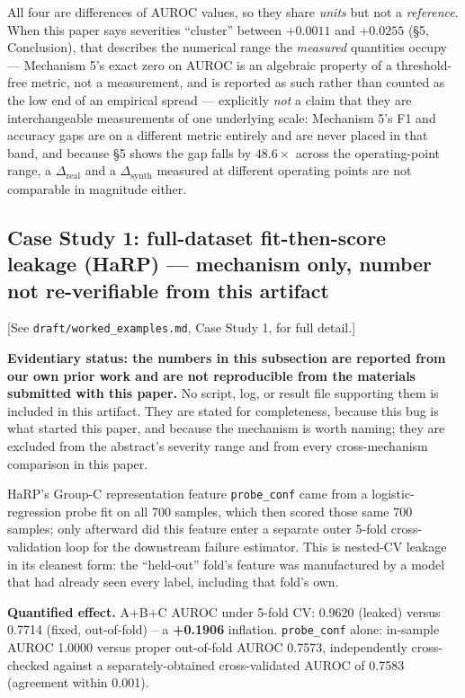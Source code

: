 \documentclass[10pt]{article} %
\begin{document}
All four are differences of AUROC values, so they share \emph{units} but not a
\emph{reference}. When this paper says severities ``cluster'' between
$+0.0011$ and $+0.0255$ (§5, Conclusion), that describes the numerical range
the \emph{measured} quantities occupy --- Mechanism 5's exact zero on AUROC is
an algebraic property of a threshold-free metric, not a measurement, and is
reported as such rather than counted as the low end of an empirical spread --- explicitly \emph{not} a claim that they are
interchangeable measurements of one underlying scale: Mechanism 5's F1 and
accuracy gaps are on a different metric entirely and are never placed in that
band, and because §5 shows the gap falls by $48.6\times$ across the
operating-point range, a $\Delta_{\text{real}}$ and a $\Delta_{\text{synth}}$
measured at different operating points are not comparable in magnitude either.

\subsection{Case Study 1: full-dataset fit-then-score leakage (HaRP) --- mechanism only, number not re-verifiable from this artifact}

[See \texttt{draft/worked\_examples.md}, Case Study 1, for full detail.]

\textbf{Evidentiary status: the numbers in this subsection are reported
from our own prior work and are not reproducible from the materials
submitted with this paper.} No script, log, or result file supporting
them is included in this artifact. They are stated for completeness,
because this bug is what started this paper, and because the mechanism is
worth naming; they are excluded from the abstract's severity range and
from every cross-mechanism comparison in this paper.

HaRP's Group-C representation feature \texttt{probe\_conf} came from a
logistic-regression probe fit on all 700 samples, which then scored those
same 700 samples; only afterward did this feature enter a separate outer
5-fold cross-validation loop for the downstream failure estimator. This is
nested-CV leakage in its cleanest form: the ``held-out'' fold's feature was
manufactured by a model that had already seen every label, including that
fold's own.

\textbf{Quantified effect.} A+B+C AUROC under 5-fold CV: 0.9620 (leaked) versus
0.7714 (fixed, out-of-fold) -- a \textbf{+0.1906} inflation. \texttt{probe\_conf}
alone: in-sample AUROC 1.0000 versus proper out-of-fold AUROC 0.7573,
independently cross-checked against a separately-obtained cross-validated
AUROC of 0.7583 (agreement within 0.001).
\end{document}
